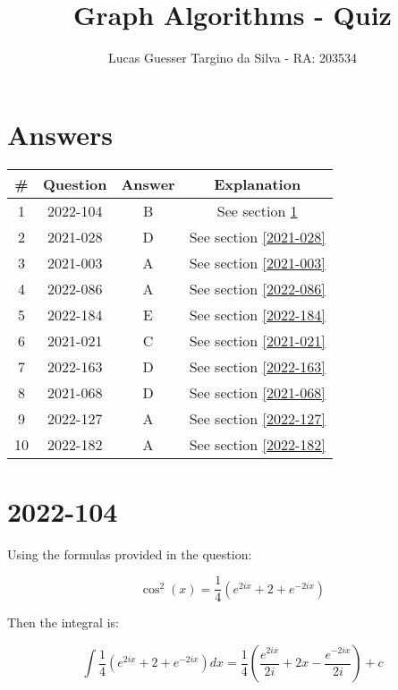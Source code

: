 \documentclass{article}
\title{Graph Algorithms - Quiz}
\author{Lucas Guesser Targino da Silva - RA: 203534}
\begin{document}
\maketitle

\section*{Answers}

\begin{table}[ht!]
    \centering
    \begin{tabular}{|c|c|c|c|}
        \hline
        \# & \textbf{Question} & \textbf{Answer} & \textbf{Explanation} \\\hline\hline
        1  & 2022-104 & B & See section \ref{2022-104} \\\hline
        2  & 2021-028 & D & See section \ref{2021-028} \\\hline
        3  & 2021-003 & A & See section \ref{2021-003} \\\hline
        4  & 2022-086 & A & See section \ref{2022-086} \\\hline
        5  & 2022-184 & E & See section \ref{2022-184} \\\hline
        6  & 2021-021 & C & See section \ref{2021-021} \\\hline
        7  & 2022-163 & D & See section \ref{2022-163} \\\hline
        8  & 2021-068 & D & See section \ref{2021-068} \\\hline
        9  & 2022-127 & A & See section \ref{2022-127} \\\hline
        10 & 2022-182 & A & See section \ref{2022-182} \\\hline
    \end{tabular}
\end{table}

\section{2022-104}\label{2022-104}

Using the formulas provided in the question:

$$
\cos^2(x) = \dfrac{1}{4} \left( e^{2ix} + 2 + e^{-2ix} \right)
$$

Then the integral is:

$$
\displaystyle\int \dfrac{1}{4} \left( e^{2ix} + 2 + e^{-2ix} \right) dx
=
\dfrac{1}{4} \left( \dfrac{e^{2ix}}{2i} + 2x - \dfrac{e^{-2ix}}{2i} \right) + c
$$
\end{document}

